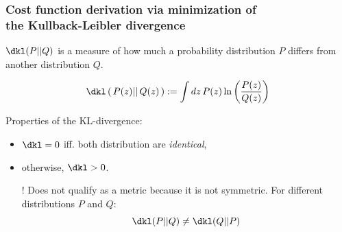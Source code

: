 \begin{frame}\frametitle{Cost function derivation via minimization of \\the Kullback-Leibler divergence}


$\dkl(P||Q)$ is a measure of how much a probability distribution $P$ differs from another distribution $Q$.

\begin{align}
\dkl\left(\, P( z) ||\, Q( z) \,\right)
:= \int d  z \, P( z)
\ln 
\left( 
\frac{P(z)}{Q(z)}
\right)
\end{align}

Properties of the KL-divergence:

\begin{itemize}
\item $\dkl = 0$ iff. both distribution are \emph{identical},
\item otherwise, $\dkl > 0$.
\item[!] Does not qualify as a metric because it is not symmetric. For different distributions $P$ and $Q$:
	\begin{equation}
	\dkl(P||Q) \ne \dkl(Q||P)
	\end{equation}
\end{itemize}

\end{frame}

